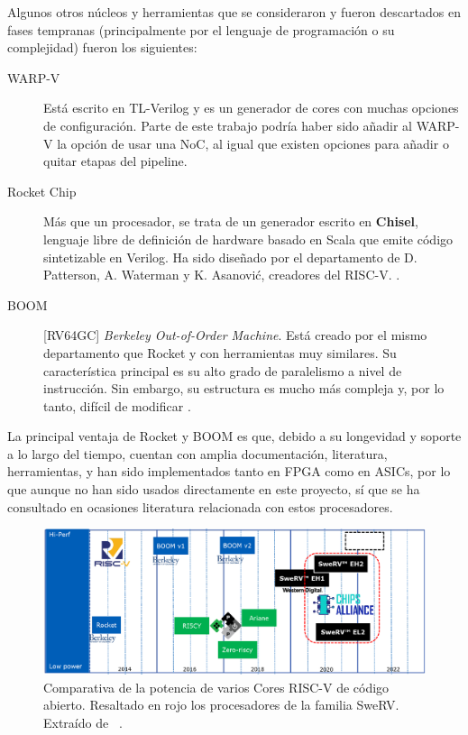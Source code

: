 Algunos otros núcleos y herramientas que se consideraron y fueron descartados en fases tempranas (principalmente por el lenguaje de programación o su complejidad) fueron los siguientes:

\begin{description}
    \item [WARP-V] Está escrito en TL-Verilog y es un generador de cores con muchas opciones de configuración. Parte de este trabajo podría haber sido añadir al WARP-V la opción de usar una NoC, al igual que existen opciones para añadir o quitar etapas del pipeline.
    \item [Rocket Chip] Más que un procesador, se trata de un generador escrito en \textbf{Chisel}, lenguaje libre de definición de hardware basado en Scala que emite código sintetizable en Verilog. Ha sido diseñado por el departamento de D. Patterson, A. Waterman y K. Asanović, creadores del RISC-V. \cite{AsanovicRocketChip}.
    \item [BOOM] [RV64GC] \textit{Berkeley Out-of-Order Machine}. Está creado por el mismo departamento que Rocket y con herramientas muy similares. Su característica principal es su alto grado de paralelismo a nivel de instrucción. Sin embargo, su estructura es mucho más compleja y, por lo tanto, difícil de modificar \cite{Celio:EECS-2015-167}.
\end{description}

La principal ventaja de Rocket y BOOM es que, debido a su longevidad y soporte a lo largo del tiempo, cuentan con amplia documentación, literatura, herramientas, y han sido implementados tanto en FPGA como en ASICs, por lo que aunque no han sido usados directamente en este proyecto, sí que se ha consultado en ocasiones literatura relacionada con estos procesadores.

\begin{figure}[h]
    \centering
    \includegraphics[width=\linewidth]{images/external/roadmap_compare.png}
    \caption[Comparativa de la potencia de varios Cores RISC-V de código abierto]{Comparativa de la potencia de varios Cores RISC-V de código abierto. Resaltado en rojo los procesadores de la familia SweRV. Extraído de ~\cite{SweRVRoadmap}.}
    \label{fig:swerv_comparative}
\end{figure}

